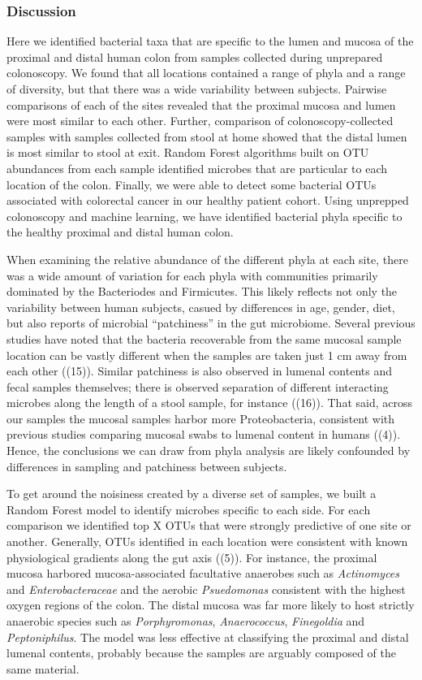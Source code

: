 \documentclass[11pt,]{article}
\begin{document}
\subsubsection{Discussion}\label{discussion}

Here we identified bacterial taxa that are specific to the lumen and
mucosa of the proximal and distal human colon from samples collected
during unprepared colonoscopy. We found that all locations contained a
range of phyla and a range of diversity, but that there was a wide
variability between subjects. Pairwise comparisons of each of the sites
revealed that the proximal mucosa and lumen were most similar to each
other. Further, comparison of colonoscopy-collected samples with samples
collected from stool at home showed that the distal lumen is most
similar to stool at exit. Random Forest algorithms built on OTU
abundances from each sample identified microbes that are particular to
each location of the colon. Finally, we were able to detect some
bacterial OTUs associated with colorectal cancer in our healthy patient
cohort. Using unprepped colonoscopy and machine learning, we have
identified bacterial phyla specific to the healthy proximal and distal
human colon.

When examining the relative abundance of the different phyla at each
site, there was a wide amount of variation for each phyla with
communities primarily dominated by the Bacteriodes and Firmicutes. This
likely reflects not only the variability between human subjects, casued
by differences in age, gender, diet, but also reports of microbial
``patchiness'' in the gut microbiome. Several previous studies have
noted that the bacteria recoverable from the same mucosal sample
location can be vastly different when the samples are taken just 1 cm
away from each other ((15)). Similar patchiness is also observed in
lumenal contents and fecal samples themselves; there is observed
separation of different interacting microbes along the length of a stool
sample, for instance ((16)). That said, across our samples the mucosal
samples harbor more Proteobacteria, consistent with previous studies
comparing mucosal swabs to lumenal content in humans ((4)). Hence, the
conclusions we can draw from phyla analysis are likely confounded by
differences in sampling and patchiness between subjects.

To get around the noisiness created by a diverse set of samples, we
built a Random Forest model to identify microbes specific to each side.
For each comparison we identified top X OTUs that were strongly
predictive of one site or another. Generally, OTUs identified in each
location were consistent with known physiological gradients along the
gut axis ((5)). For instance, the proximal mucosa harbored
mucosa-associated facultative anaerobes such as \emph{Actinomyces} and
\emph{Enterobacteraceae} and the aerobic \emph{Psuedomonas} consistent
with the highest oxygen regions of the colon. The distal mucosa was far
more likely to host strictly anaerobic species such as
\emph{Porphyromonas}, \emph{Anaerococcus}, \emph{Finegoldia} and
\emph{Peptoniphilus}. The model was less effective at classifying the
proximal and distal lumenal contents, probably because the samples are
arguably composed of the same material.
\end{document}
